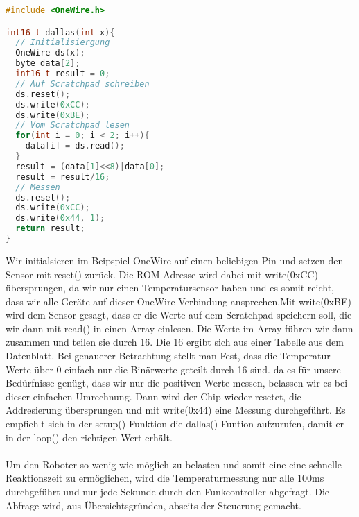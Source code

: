 \documentclass{article}
\begin{document}
\begin{file}[DS18B20]	
        \begin{lstlisting}[language=C++, inputencoding={utf8}, extendedchars=false]        
#include <OneWire.h>

int16_t dallas(int x){
  // Initialisiergung
  OneWire ds(x); 
  byte data[2];
  int16_t result = 0;
  // Auf Scratchpad schreiben
  ds.reset(); 
  ds.write(0xCC);
  ds.write(0xBE); 
  // Vom Scratchpad lesen
  for(int i = 0; i < 2; i++){
    data[i] = ds.read();
  } 
  result = (data[1]<<8)|data[0];
  result = result/16;
  // Messen
  ds.reset();
  ds.write(0xCC);  
  ds.write(0x44, 1);
  return result;
}
        \end{lstlisting}
        
\end{file}
Wir initialsieren im Beipspiel OneWire auf einen beliebigen Pin und setzen den Sensor mit reset() zurück. Die ROM Adresse wird dabei mit write(0xCC) übersprungen, da wir nur einen Temperatursensor haben und es somit reicht, dass wir alle Geräte auf dieser OneWire-Verbindung ansprechen.Mit write(0xBE) wird dem Sensor gesagt, dass er die Werte auf dem Scratchpad speichern soll, die wir dann mit read() in einen Array einlesen. Die Werte im Array führen wir dann zusammen und teilen sie durch 16. Die 16 ergibt sich aus einer Tabelle aus dem Datenblatt. Bei genauerer Betrachtung stellt man Fest, dass die Temperatur Werte über 0 einfach nur die Binärwerte geteilt durch 16 sind. da es für unsere Bedürfnisse genügt, dass wir nur die positiven Werte messen, belassen wir es bei dieser einfachen Umrechnung. Dann wird der Chip wieder resetet, die Addresierung übersprungen  und mit write(0x44) eine Messung durchgeführt. Es empfiehlt sich in der setup() Funktion die dallas() Funtion aufzurufen, damit er in der loop() den richtigen Wert erhält.\\
\\   
Um den Roboter so wenig wie möglich zu belasten und somit eine eine schnelle Reaktionszeit zu ermöglichen, wird die Temperaturmessung nur alle 100ms durchgeführt und nur jede Sekunde durch den Funkcontroller abgefragt. Die Abfrage wird, aus Übersichtsgründen, abseits der Steuerung gemacht.

\newpage
\end{document}
